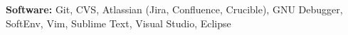

\vspace{5pt}

\textbf{Software:} Git, CVS, Atlassian (Jira, Confluence, Crucible), GNU Debugger, SoftEnv, Vim, Sublime Text, Visual Studio, Eclipse
